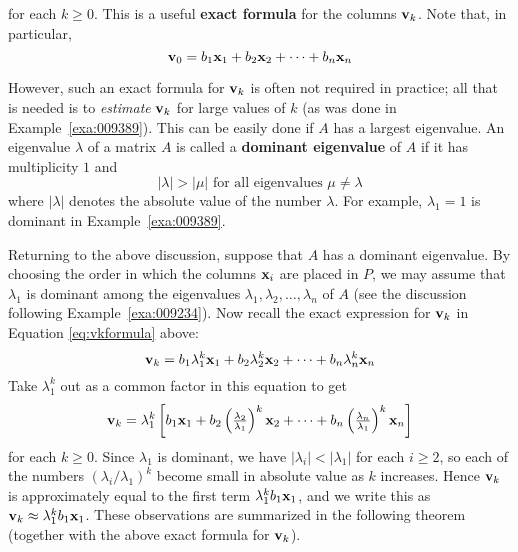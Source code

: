 for each $k \geq 0$. This is a useful \textbf{exact formula} for the columns $\textbf{v}_{k}$. Note that, in particular, 
\begin{equation*}
\textbf{v}_{0} = b_{1}\textbf{x}_{1} + b_{2}\textbf{x}_{2} + \dots  + b_{n}\textbf{x}_{n}
\end{equation*}


However, such an exact formula for $\textbf{v}_{k}$ is often not required in practice; all that is needed is to \textit{estimate} $\textbf{v}_{k}$ for large values of $k$ (as was done in Example~\ref{exa:009389}). This can be easily done if $A$ has a largest eigenvalue. An eigenvalue $\lambda$ of a matrix $A$ is called a \textbf{dominant eigenvalue} of $A$ if it has multiplicity $1$ and
\begin{equation*}
| \lambda | > | \mu | \mbox{ for all eigenvalues } \mu \neq \lambda
\end{equation*}
where $|\lambda |$ denotes the absolute value of the number $\lambda$. For example, $\lambda_{1} = 1$ is dominant in Example~\ref{exa:009389}.


Returning to the above discussion, suppose that $A$ has a dominant eigenvalue. By choosing the order in which the columns $\textbf{x}_{i}$ are placed in $P$, we may assume that $\lambda_{1}$ is dominant among the eigenvalues $\lambda_{1}, \lambda_{2}, \dots , \lambda_{n}$ of $A$ (see the discussion following Example~\ref{exa:009234}). Now recall the exact expression for $\textbf{v}_{k}$ in Equation \ref{eq:vkformula} above:
\begin{equation*}
\textbf{v}_k = b_1 \lambda_1^k \textbf{x}_1 + b_2 \lambda_2^k \textbf{x}_2 + \cdots + b_n \lambda_n^k \textbf{x}_n 
\end{equation*}
Take $\lambda_1^k$ out as a common factor in this equation to get
\begin{equation*}
\textbf{v}_k = \lambda_1^k \left[ b_1 \textbf{x}_1 + b_2 \left( \tfrac{\lambda_2}{\lambda_1}\right)^k \textbf{x}_2 + \cdots + b_n \left( \tfrac{\lambda_n}{\lambda_1}\right)^k \textbf{x}_n \right]
\end{equation*}
for each $k \geq 0$. Since $\lambda_{1}$ is dominant, we have $|\lambda_{i}| < |\lambda_{1}|$ for each $i \geq 2$, so each of the numbers $(\lambda_{i} /\lambda_{1})^{k}$ become small in absolute value as $k$ increases. Hence $\textbf{v}_{k}$ is approximately equal to the first term $\lambda_1^k b_1 \textbf{x}_1$, and we write this as $\textbf{v}_k \approx \lambda_1^k b_1 \textbf{x}_1$. These observations are summarized in the following theorem (together with the above exact formula for $\textbf{v}_{k}$).

